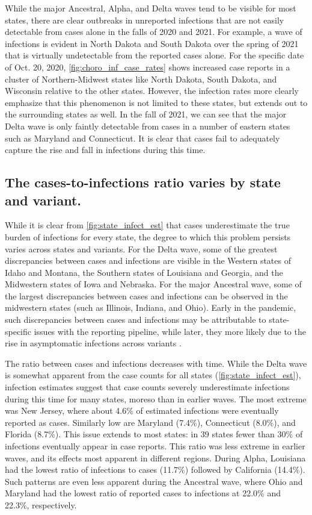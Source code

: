 While the major Ancestral, Alpha, and Delta waves tend to be visible for most
states, there are clear outbreaks in unreported infections that are not easily
detectable from cases alone in the falls of 2020 and 2021. For example, a wave 
of infections is evident in North Dakota and South Dakota over the spring of 2021
that is virtually undetectable from the reported cases alone. For the specific date
of Oct. 20, 2020, \autoref{fig:choro_inf_case_rates} shows increased case
reports in a cluster of Northern-Midwest states like North Dakota, South Dakota,
and Wisconsin relative to the other states. However, the infection rates more clearly
emphasize that this phenomenon is not limited to these states, but extends out
to the surrounding states as well. In the fall of 2021, we can see that the
major Delta wave is only faintly detectable from cases in a number of eastern
states such as Maryland and Connecticut. It is clear that cases fail to
adequately capture the rise and fall in infections during this time.

\subsection{The cases-to-infections ratio varies by state and variant.}
\label{sec:case-infection-ratio}

While it is clear from \autoref{fig:state_infect_est} that cases underestimate
the true burden of infections for every state, the degree to which this problem
persists varies across states and variants. For the Delta wave, some of
the greatest discrepancies between cases and infections are visible in the
Western states of Idaho and Montana, the Southern states of Louisiana and
Georgia, and the Midwestern states of Iowa and Nebraska. For the major Ancestral wave, 
some of the largest discrepancies between cases and infections can be observed in the
midwestern states (such as Illinois, Indiana, and Ohio). Early
in the pandemic, such discrepancies between cases and infections may be
attributable to state-specific issues with the reporting pipeline, while later, 
they more likely due to the rise in asymptomatic infections
across variants \citep{oph2022covid, garrett2022high}. 

The ratio between cases and infections decreases with time. While the Delta wave
is somewhat apparent from the case counts for all states
(\autoref{fig:state_infect_est}), infection estimates suggest that case counts
severely underestimate infections during this time for many states, moreso than
in earlier waves. The most extreme was New Jersey, where about 4.6\% of
estimated infections were eventually reported as cases. Similarly low are
Maryland (7.4\%), Connecticut (8.0\%), and Florida (8.7\%). This issue extends
to most states: in 39 states fewer than 30\% of infections eventually
appear in case reports. This ratio was less extreme in earlier waves, and its
effects most apparent in different regions. During Alpha, Louisiana had the
lowest ratio of infections to cases (11.7\%) followed by California (14.4\%).
Such patterns are even less apparent during the Ancestral wave, where Ohio and
Maryland had the lowest ratio of reported cases to infections at 22.0\%  and
22.3\%, respectively. 

